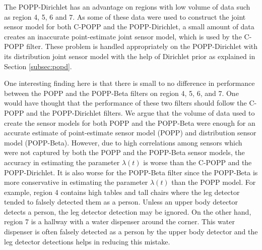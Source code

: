 The POPP-Dirichlet has an advantage on regions with low volume of data such as region 4, 5, 6 and 7. As some of these data were used to construct the joint sensor model for both C-POPP and the POPP-Dirichlet, a small amount of data creates an inaccurate point-estimate joint sensor model, which is used by the C-POPP filter. These problem is handled appropriately on the POPP-Dirichlet with its distribution joint sensor model with the help of Dirichlet prior as explained in Section \ref{subsec:popd}.

One interesting finding here is that there is small to no difference in performance between the POPP and the POPP-Beta filters on region 4, 5, 6, and 7. One would have thought that the performance of these two filters should follow the C-POPP and the POPP-Dirichlet filters. We argue that the volume of data used to create the sensor models for both POPP and the POPP-Beta were enough for an accurate estimate of point-estimate sensor model (POPP) and distribution sensor model (POPP-Beta). However, due to high correlations among sensors which were not captured by both the POPP and the POPP-Beta sensor models, the accuracy in estimating the parameter $\lambda(t)$ is worse than the C-POPP and the POPP-Dirichlet. It is also worse for the POPP-Beta filter since the POPP-Beta is more conservative in estimating the parameter $\lambda(t)$ than the POPP model. For example, region 4 contains high tables and tall chairs where the leg detector tended to falsely detected them as a person. Unless an upper body detector detects a person, the leg detector detection may be ignored. On the other hand, region 7 is a hallway with a water dispenser around the corner. This water dispenser is often falsely detected as a person by the upper body detector and the leg detector detections helps in reducing this mistake.


